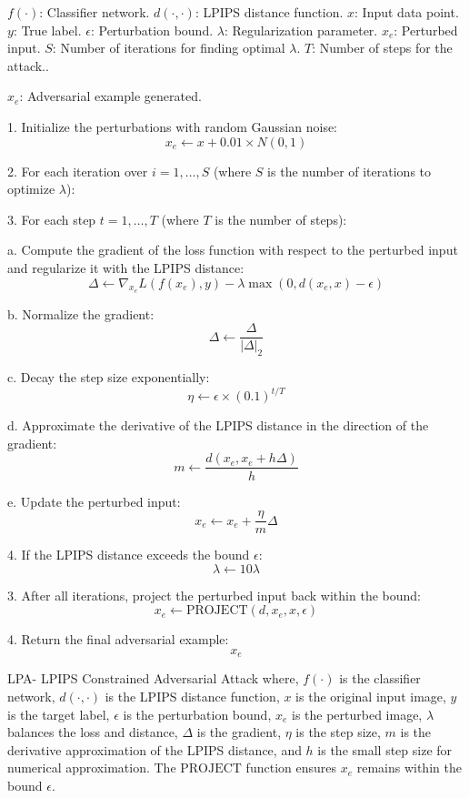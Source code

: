 $f(\cdot)$: Classifier network.
$d(\cdot, \cdot)$: LPIPS distance function.
$x$: Input data point.
$y$: True label.
$\epsilon$: Perturbation bound.
$\lambda$: Regularization parameter.
$x_e$: Perturbed input.
$S$: Number of iterations for finding optimal $\lambda$.
$T$: Number of steps for the attack..

$x_e$: Adversarial example generated.

1. Initialize the perturbations with random Gaussian noise:
   \[
   x_e \leftarrow x + 0.01 \times N(0, 1)
   \]
   
2. For each iteration over $i = 1, \ldots, S$ (where $S$ is the number of iterations to optimize $\lambda$):

    3. For each step $t = 1, \ldots, T$ (where $T$ is the number of steps):

        a. Compute the gradient of the loss function with respect to the perturbed input and regularize it with the LPIPS distance:
           \[
           \Delta \leftarrow \nabla_{x_e} L(f(x_e), y) - \lambda \max \left(0, d(x_e, x) - \epsilon \right)
           \]
           
        b. Normalize the gradient:
           \[
           \Delta \leftarrow \frac{\Delta}{|\Delta|_2}
           \]
           
        c. Decay the step size exponentially:
           \[
           \eta \leftarrow \epsilon \times (0.1)^{t/T}
           \]
           
        d. Approximate the derivative of the LPIPS distance in the direction of the gradient:
           \[
           m \leftarrow \frac{d(x_e, x_e + h \Delta)}{h}
           \]
           
        e. Update the perturbed input:
           \[
           x_e \leftarrow x_e + \frac{\eta}{m} \Delta
           \]
           
    4. If the LPIPS distance exceeds the bound $\epsilon$:
       \[
       \lambda \leftarrow 10 \lambda
       \]
       
3. After all iterations, project the perturbed input back within the bound:
   \[
   x_e \leftarrow \text{PROJECT}(d, x_e, x, \epsilon)
   \]

4. Return the final adversarial example:
   \[
   x_e
   \]

LPA- LPIPS Constrained Adversarial Attack where, $f(\cdot)$ is the classifier network, $d(\cdot, \cdot)$ is the LPIPS distance function, $x$ is the original input image, $y$ is the target label, $\epsilon$ is the perturbation bound, $x_e$ is the perturbed image, $\lambda$ balances the loss and distance, $\Delta$ is the gradient, $\eta$ is the step size, $m$ is the derivative approximation of the LPIPS distance, and $h$ is the small step size for numerical approximation. The $\text{PROJECT}$ function ensures $x_e$ remains within the bound $\epsilon$.
